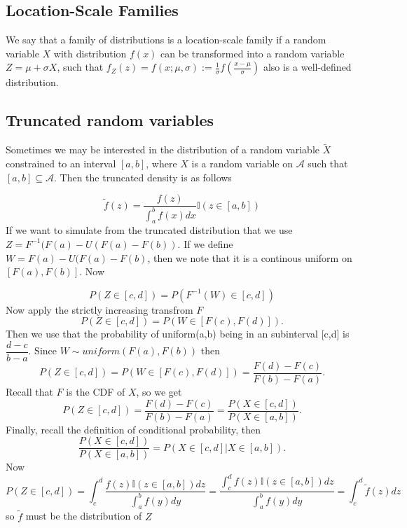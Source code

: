 \documentclass{article}
\theoremstyle{definition}
\theoremstyle{remark}
\begin{document}
\subsection{Location-Scale Families}
We say that a family of distributions is a location-scale family if a random variable $X$ with distribution $f(x)$
can be transformed into a random variable $Z = \mu + \sigma X$, such that $f_Z(z) = f(x; \mu, \sigma) := \frac{1}{\sigma} f(\frac{x - \mu}{\sigma})$ also is a well-defined distribution.

\subsection{Truncated random variables}
Sometimes we may be interested in the distribution of a random variable $\tilde X$ constrained to an interval $[a,b]$, where $X$ is a random variable on $\mathcal{A}$ such that $[a,b]\subseteq \mathcal{A}$. Then the truncated density is as follows

$$
\tilde f(z) = \dfrac{f(z)}{\int_{a}^{b}f(x)dx}\mathbb{I}(z \in [a,b])
$$
If we want to simulate from the truncated distribution that we use $ Z = F^{-1}(F(a) - U(F(a)-F(b)).$ If we define $W =F(a) - U(F(a)-F(b)$, then we note that it is a continous uniform on $[F(a), F(b)]$. Now

$$
P(Z \in [c,d]) = P(F^{-1}(W) \in [c,d])
$$
Now apply the strictly increasing transfrom $F$
$$
P(Z \in [c,d]) = P(W \in [F(c),F(d)]).
$$
Then we use that the probability of uniform(a,b) being in an subinterval [c,d] is $\dfrac{d-c}{b-a}$. Since $W \sim uniform(F(a), F(b))$ then
$$
P(Z \in [c,d]) = P(W \in [F(c),F(d)]) = \dfrac{F(d)-F(c)}{F(b)- F(a)}.
$$
Recall that $F$ is the CDF of $X$, so we get
$$
P(Z \in [c,d]) = \dfrac{F(d)-F(c)}{F(b)- F(a)} = \dfrac{P(X \in [c,d])}{P(X \in [a,b])}.
$$
Finally, recall the definition of conditional probability, then
$$
\dfrac{P(X \in [c,d])}{P(X \in [a,b])} = P(X \in [c,d]| X \in [a,b]).
$$
Now
$$
 P(Z \in [c,d]) = \int_{c}^{d}\dfrac{f(z)\mathbb{I}(z \in [a,b])dz}{\int_{a}^{b}f(y)dy}= \dfrac{\int_{c}^{d}f(z)\mathbb{I}(z \in [a,b])dz}{\int_{a}^{b}f(y)dy} = \int_{c}^{d}\tilde f(z)dz
$$
so $\tilde f$ must be the distribution of $Z$
\end{document}
